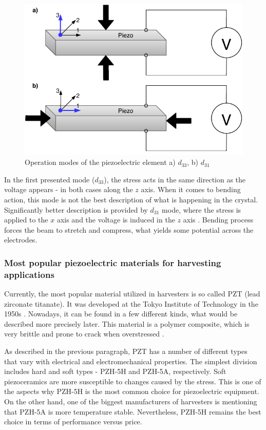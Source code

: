 \documentclass[12pt,a4paper]{article}
\begin{document}
\begin{figure}[ht!]
\includegraphics[scale=1]{piezo_operation_modes.pdf}
\caption{Operation modes of the piezoelectric element a)  $d_{33}$, b) $d_{31}$}
\label{fig:piezo_modes}
\end{figure}

In the first presented mode ($d_{33}$), the stress acts in the same direction as the voltage appears - in both cases along the $z$ axis. When it comes to bending action, this mode is not the best description of what is happening in the crystal. Significantly better description is provided by $d_{31}$ mode, where the stress is applied to the $x$ axis and the voltage is induced in the $z$ axis \cite{cmos}. Bending process forces the beam to stretch and compress, what yields some potential across the electrodes. 
\subsubsection{Most popular piezoelectric materials for harvesting applications}
Currently, the most popular material utilized in harvesters is so called PZT (lead zirconate titanate). It was developed at the Tokyo Institute of Technology in the 1950s \cite{EnHv2}. Nowadays, it can be found in a few different kinds, what would be described more precisely later. This material is a polymer composite, which is very brittle and prone to crack when overstressed \cite{cmos}.
\par

As described in the previous paragraph, PZT has a number of different types that vary with electrical and electromechanical properties. The simplest division includes hard and soft types - PZH-5H and PZH-5A, respectively. Soft piezoceramics are more susceptible to changes caused by the stress. This is one of the aspects why PZH-5H is the most common choice for piezoelectric equipment. On the other hand, one of the biggest manufacturers of harvesters \cite{PPA} is mentioning that PZH-5A is more temperature stable. Nevertheless, PZH-5H remains the best choice in terms of performance versus price. 
\par
\end{document}
